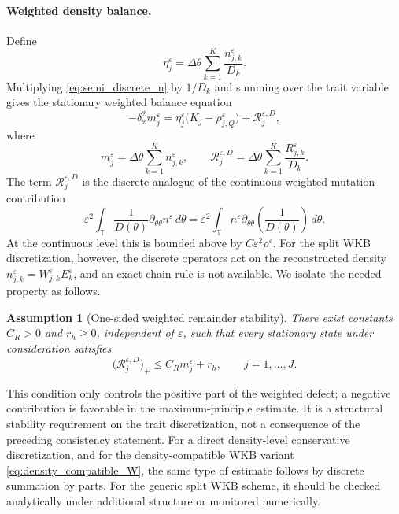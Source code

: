 \documentclass[11pt]{article}
\newtheorem{assumption}{Assumption}[section]
\begin{document}
\paragraph{Weighted density balance.}
Define
\[
    \eta_j^\varepsilon
    =
    \Delta\theta
    \sum_{k=1}^K
    \frac{n_{j,k}^\varepsilon}{D_k} .
\]
Multiplying \eqref{eq:semi_discrete_n} by \(1/D_k\) and summing over the
trait variable gives the stationary weighted balance equation
\begin{equation}\label{eq:weighted_summed_density_stationary}
    -\delta_x^2m_j^\varepsilon
    =
    \eta_j^\varepsilon
    \bigl(K_j-\rho_{j,Q}^\varepsilon\bigr)
    +
    \mathcal R_j^{\varepsilon,D},
\end{equation}
where
\[
    m_j^\varepsilon
    =
    \Delta\theta\sum_{k=1}^K n_{j,k}^\varepsilon,
    \qquad
    \mathcal R_j^{\varepsilon,D}
    =
    \Delta\theta
    \sum_{k=1}^K
    \frac{R_{j,k}^\varepsilon}{D_k} .
\]
The term \(\mathcal R_j^{\varepsilon,D}\) is the discrete analogue of the
continuous weighted mutation contribution
\[
    \varepsilon^2
    \int_{\mathbb T}
    \frac1{D(\theta)}
    \partial_{\theta\theta}n^\varepsilon
    \,d\theta
    =
    \varepsilon^2
    \int_{\mathbb T}
    n^\varepsilon
    \partial_{\theta\theta}\left(\frac1{D(\theta)}\right)
    \,d\theta .
\]
At the continuous level this is bounded above by
\(C\varepsilon^2\rho^\varepsilon\). For the split WKB discretization, however,
the discrete operators act on the reconstructed density
\(n_{j,k}^\varepsilon=W_{j,k}^\varepsilon E_k^\varepsilon\), and an exact
chain rule is not available. We isolate the needed property as follows.

\begin{assumption}[One-sided weighted remainder stability]
\label{ass:remainder_stability}
There exist constants \(C_R>0\) and \(r_h\ge0\), independent of
\(\varepsilon\), such that every stationary state under consideration
satisfies
\begin{equation}\label{eq:remainder_CR_bound}
    \bigl(\mathcal R_j^{\varepsilon,D}\bigr)_+
    \le
    C_R m_j^\varepsilon+r_h,
    \qquad j=1,\ldots,J .
\end{equation}
\end{assumption}

This condition only controls the positive part of the weighted defect; a
negative contribution is favorable in the maximum-principle estimate. It is a
structural stability requirement on the trait discretization, not a consequence
of the preceding consistency statement. For a direct density-level conservative
discretization, and for the density-compatible WKB variant
\eqref{eq:density_compatible_W}, the same type of estimate follows by discrete
summation by parts. For the generic split WKB scheme, it should be checked
analytically under additional structure or monitored numerically.
\end{document}
